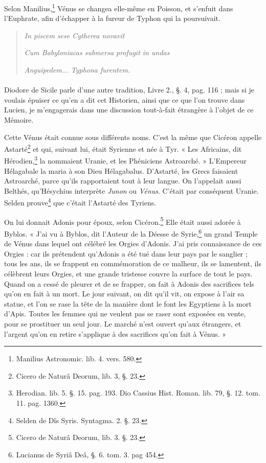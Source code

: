 \documentclass[a4paper, 18pt, oneside]{article}
\begin{document}
Selon Manilius,\footnote{Manilius Astronomic. lib. 4. vers. 580.} Vénus se changea elle-même en Poisson, et s'enfuit dans l'Euphrate, afin d'échapper à la fureur de Typhon qui la poursuivait.
\begin{quotation}
\hspace*{15mm}\emph{In piscem sese Cytherea novavit}

\emph{Cum Babyloniacas submersa profugit in undas}

\emph{Anguipedem... Typhona furentem.}
\end{quotation}
\paragraph{}
Diodore de Sicile parle d'une autre tradition, Livre 2., §. 4, pag. 116 ; mais si je voulais épuiser ce qu'en a dit cet Historien, ainsi que ce que l'on trouve dans Lucien, je m'engagerais dans une discussion tout-à-fait étrangère à l'objet de ce Mémoire.

Cette Vénus était connue sous différents noms. C'est la même que Cicéron appelle Astarté\footnote{Cicero de Naturâ Deorum, lib. 3, §. 23.} et qui, suivant lui, était Syrienne et née à Tyr. « Les Africains, dit Hérodien,\footnote{Herodian. lib. 5. §. 15. pag. 193. Dio Cassius Hist. Roman. lib. 79, §. 12. tom. 11. pag. 1360.} la nommaient Uranie, et les Phéniciens Astroarché. » L'Empereur Hélagabale la maria à son Dieu Hélagabalus. D'Astarté, les Grecs faisaient Astroarché, parce qu'ils rapportaient tout à leur langue. On l'appelait aussi Belthés, qu'Hésychius interprète \emph{Junon} ou \emph{Vénus}. C'était par conséquent Uranie. Selden prouve\footnote{Selden de Dîs Syris. Syntagma. 2. §. 23.} que c'était l'Astarté des Tyriens.

On lui donnait Adonis pour époux, selon Cicéron.\footnote{Cicero de Naturâ Deorum, lib. 3. §. 23.} Elle était aussi adorée à Byblos. « J'ai vu à Byblos, dit l'Auteur de la Déesse de Syrie,\footnote{Lucianus de Syriâ Deâ, §. 6. tom. 3. pag 454.} un grand Temple de Vénus dans lequel ont célébré les Orgies d'Adonis. J'ai pris connaissance de ces Orgies : car ils prétendent qu'Adonis a été tué dans leur pays par le sanglier ; tous les ans, ils se frappent en commémoration de ce malheur, ils se lamentent, ils célèbrent leurs Orgies, et une grande tristesse couvre la surface de tout le pays. Quand on a cessé de pleurer et de se frapper, on fait à Adonis des sacrifices tels qu'on en fait à un mort. Le jour suivant, on dit qu'il vit, on expose à l'air sa statue, et l'on se rase la tête de la manière dont le font les Egyptiens à la mort d'Apis. Toutes les femmes qui ne veulent pas se raser sont exposées en vente, pour se prostituer un seul jour. Le marché n'est ouvert qu'aux étrangers, et l'argent qu'on en retire s'applique à des sacrifices qu'on fait à Vénus. »
\end{document}

